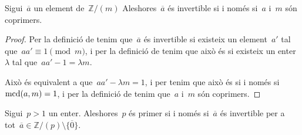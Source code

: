 \documentclass[../../main.tex]{subfiles}
\begin{document}
    \begin{proposition}
        \label{prop:condició equivalent a invertible en Z/(m)}
        Sigui~\(\overline{a}\) un element de~\(\mathbb{Z}/(m)\) Aleshores~\(\overline{a}\) és invertible si i només si~\(a\) i~\(m\) són coprimers.
        \begin{proof}
            Per la definició de  tenim que~\(\overline{a}\) és invertible si existeix un element~\(a'\) tal que~\(aa'\equiv1\pmod{m}\), i per la definició de  tenim que això és si existeix un enter~\(\lambda\) tal que~\(aa'-1=\lambda m\).

            Això és equivalent a que~\(aa'-\lambda m=1\), i per  tenim que això és si i només si~\(\operatorname{mcd}(a,m)=1\), i per la definició de  tenim que~\(a\) i~\(m\) són coprimers.
        \end{proof}
    \end{proposition}
    \begin{corollary}
        \label{corollary:Z/(p) és un cos}
        \label{corollary:Z/(p) és un cos sii p és primer}
        Sigui~\(p>1\) un enter.
        Aleshores~\(p\) és primer si i només si~\(\overline{a}\) és invertible per a tot~\(\overline{a}\in\mathbb{Z}/(p)\setminus\{\overline{0}\}\).
    \end{corollary}
\end{document}
